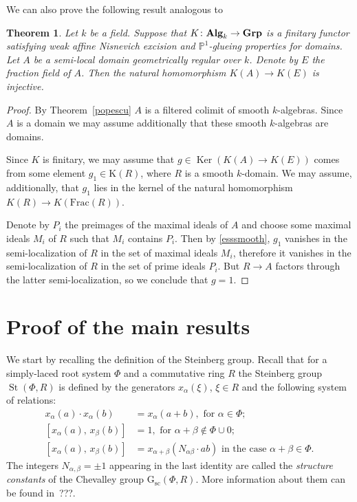 \documentclass[oneside, 11pt]{amsart} \pdfoutput=1
\newcommand{\Ker}{\mathop{\mathrm{Ker}}\nolimits}
\newcommand{\St}{\mathop{\mathrm{St}}\nolimits}
\numberwithin{equation}{section}
\newtheorem{theorem}[lemma]{Theorem}
\theoremstyle{definition}
\newcommand{\catname}[1]{{\normalfont\textbf{#1}}} %
\begin{document}
We can also prove the following result analogous to~\cite[Theorem~1.2]{Sta20}
\begin{theorem}
Let $k$ be a field.
Suppose that $K\colon\catname{Alg}_k\rightarrow\catname{Grp}$
is a finitary functor satisfying weak affine Nisnevich excision and $\mathbb{P}^1$-glueing properties for domains. 
Let $A$ be a semi-local domain geometrically regular over $k$. 
Denote by $E$ the fraction field of $A$.
Then the natural homomorphism $K(A) \to K(E)$ is injective.
\end{theorem}
\begin{proof}
By Theorem~\ref{popescu} $A$ is a filtered colimit of smooth $k$-algebras. Since $A$ is a domain we may assume additionally that these smooth $k$-algebras are domains.

Since $K$ is finitary, we may assume that $g \in \Ker(K(A) \to K(E))$ comes from some element $g_1\in\mathrm K(R)$, where $R$ is a smooth $k$-domain. We may assume, additionally, that $g_1$ lies in the kernel of the natural homomorphism $K(R) \to K(\mathrm{Frac}(R))$.

Denote by $P_i$ the preimages of the maximal ideals of $A$ and choose some maximal ideals $M_i$ of $R$ such that $M_i$ contains $P_i$. Then by \cref{esssmooth}, $g_1$ vanishes in the semi-localization of $R$ in the set of maximal ideals $M_i$, therefore it vanishes in the semi-localization of $R$ in the set of prime ideals $P_i$.
But $R\rightarrow A$ factors through the latter semi-localization, so we conclude that $g=1$. 
\end{proof}

\section{Proof of the main results}
We start by recalling the definition of the Steinberg group.
Recall that for a simply-laced root system $\Phi$ and a commutative ring $R$ the Steinberg group $\St(\Phi, R)$ is defined by the generators $x_\alpha(\xi)$, $\xi \in R$ and the following system of relations:
\begin{align}
x_{\alpha}(a)\cdot x_{\alpha}(b)&=x_{\alpha}(a+b),\text{ for } \alpha\in \Phi;\tag{R1} \label{R1}\\
[x_{\alpha}(a),\,x_{\beta}(b)]  &=1,\text{ for }\alpha+\beta\not\in\Phi\cup 0; \tag{R2} \label{R2} \\
[x_{\alpha}(a),\,x_{\beta}(b)]  &=x_{\alpha+\beta}(N_{\alpha\beta} \cdot ab)\text{ in the case }\alpha+\beta\in\Phi. \tag{R3} \label{R3} \end{align}
The integers $N_{\alpha,\beta} = \pm 1$ appearing in the last identity are called the {\it structure constants} of the Chevalley group $\mathrm{G}_\mathrm{sc}(\Phi, R)$.
More information about them can be found in~???.
\end{document}
